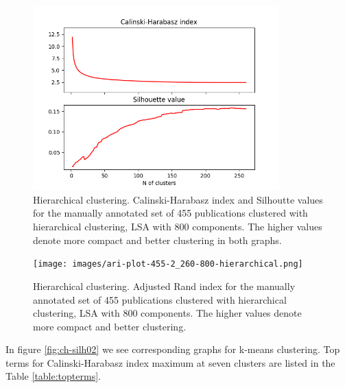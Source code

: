 \begin{figure}[ht]
  \begin{center}    
\includegraphics[width=9.5cm]{images/c-h-silh-index-plot-519-2_260-800-hierarchical.png}
    \caption{Hierarchical clustering. Calinski-Harabasz index and Silhoutte values for the
    manually annotated set of 455 publications clustered with hierarchical
    clustering, LSA with 800 components. The higher values denote 
    more compact and better clustering in both graphs.}
    \label{fig:ch-silh01}
  \end{center}
\end{figure}

\begin{figure}[ht]
  \begin{center}    
\texttt{[image: images/ari-plot-455-2\_260-800-hierarchical.png]}
    \caption{Hierarchical clustering. Adjusted Rand index for the
    manually annotated set of 455 publications clustered with hierarchical
    clustering, LSA with 800 components. The higher values denote 
    more compact and better clustering.}
    \label{fig:ari01}
  \end{center}
\end{figure}


In figure \ref{fig:ch-silh02}
we see corresponding graphs for k-means clustering. Top terms for
Calinski-Harabasz index maximum at seven clusters are listed in 
the Table \ref{table:topterms}.


